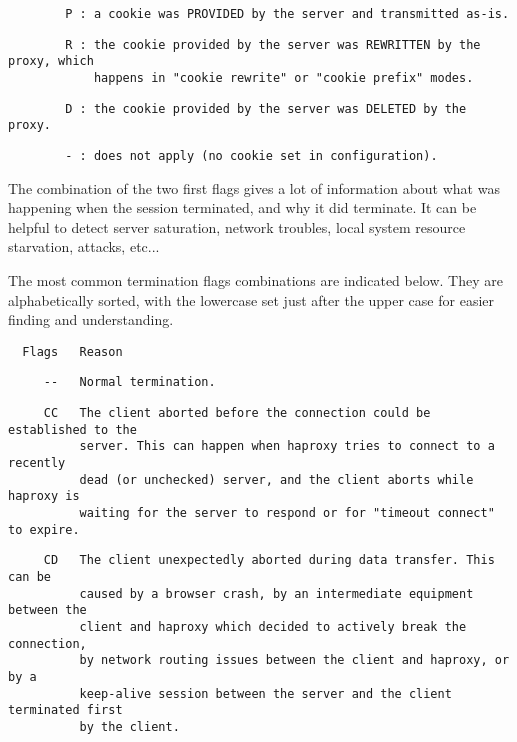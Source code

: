 \begin{verbatim}
        P : a cookie was PROVIDED by the server and transmitted as-is.
\end{verbatim}

\begin{verbatim}
        R : the cookie provided by the server was REWRITTEN by the proxy, which
            happens in "cookie rewrite" or "cookie prefix" modes.
\end{verbatim}

\begin{verbatim}
        D : the cookie provided by the server was DELETED by the proxy.
\end{verbatim}

\begin{verbatim}
        - : does not apply (no cookie set in configuration).
\end{verbatim}


The combination of the two first flags gives a lot of information about what
was happening when the session terminated, and why it did terminate. It can be
helpful to detect server saturation, network troubles, local system resource
starvation, attacks, etc...


The most common termination flags combinations are indicated below. They are
alphabetically sorted, with the lowercase set just after the upper case for
easier finding and understanding.

\begin{verbatim}
  Flags   Reason
\end{verbatim}

\begin{verbatim}
     --   Normal termination.
\end{verbatim}

\begin{verbatim}
     CC   The client aborted before the connection could be established to the
          server. This can happen when haproxy tries to connect to a recently
          dead (or unchecked) server, and the client aborts while haproxy is
          waiting for the server to respond or for "timeout connect" to expire.
\end{verbatim}

\begin{verbatim}
     CD   The client unexpectedly aborted during data transfer. This can be
          caused by a browser crash, by an intermediate equipment between the
          client and haproxy which decided to actively break the connection,
          by network routing issues between the client and haproxy, or by a
          keep-alive session between the server and the client terminated first
          by the client.
\end{verbatim}

